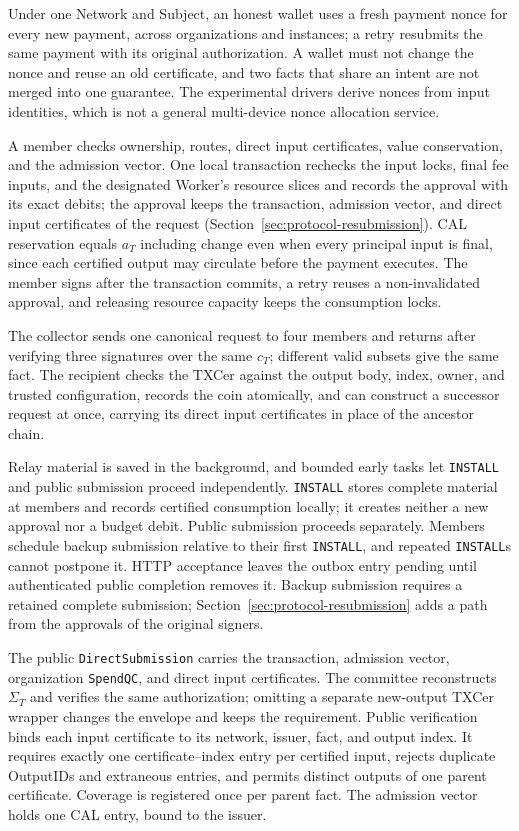 Under one Network and Subject, an honest wallet uses a fresh payment nonce for every new payment, across organizations and instances; a retry resubmits the same payment with its original authorization. A wallet must not change the nonce and reuse an old certificate, and two facts that share an intent are not merged into one guarantee. The experimental drivers derive nonces from input identities, which is not a general multi-device nonce allocation service.

A member checks ownership, routes, direct input certificates, value conservation, and the admission vector. One local transaction rechecks the input locks, final fee inputs, and the designated Worker's resource slices and records the approval with its exact debits; the approval keeps the transaction, admission vector, and direct input certificates of the request (Section~\ref{sec:protocol-resubmission}). CAL reservation equals $a_T$ including change even when every principal input is final, since each certified output may circulate before the payment executes. The member signs after the transaction commits, a retry reuses a non-invalidated approval, and releasing resource capacity keeps the consumption locks.

The collector sends one canonical request to four members and returns after verifying three signatures over the same $c_T$; different valid subsets give the same fact. The recipient checks the TXCer against the output body, index, owner, and trusted configuration, records the coin atomically, and can construct a successor request at once, carrying its direct input certificates in place of the ancestor chain.

Relay material is saved in the background, and bounded early tasks let \texttt{INSTALL} and public submission proceed independently. \texttt{INSTALL} stores complete material at members and records certified consumption locally; it creates neither a new approval nor a budget debit. Public submission proceeds separately. Members schedule backup submission relative to their first \texttt{INSTALL}, and repeated \texttt{INSTALL}s cannot postpone it. HTTP acceptance leaves the outbox entry pending until authenticated public completion removes it. Backup submission requires a retained complete submission; Section~\ref{sec:protocol-resubmission} adds a path from the approvals of the original signers.

The public \texttt{DirectSubmission} carries the transaction, admission vector, organization \texttt{SpendQC}, and direct input certificates. The committee reconstructs $\Sigma_T$ and verifies the same authorization; omitting a separate new-output TXCer wrapper changes the envelope and keeps the requirement. Public verification binds each input certificate to its network, issuer, fact, and output index. It requires exactly one certificate--index entry per certified input, rejects duplicate OutputIDs and extraneous entries, and permits distinct outputs of one parent certificate. Coverage is registered once per parent fact. The admission vector holds one CAL entry, bound to the issuer.
